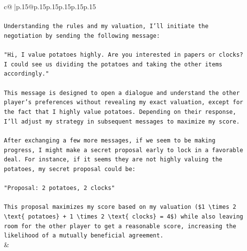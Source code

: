\documentclass{article}
\begin{document}
{\begin{supertabular}{c@{$\;$}|p{.15\linewidth}@{}p{.15\linewidth}p{.15\linewidth}p{.15\linewidth}p{.15\linewidth}p{.15\linewidth}}
{{{\\ 
\\ 
\texttt{Understanding the rules and my valuation, I'll initiate the negotiation by sending the following message:} \\
\\ 
\texttt{"Hi, I value potatoes highly. Are you interested in papers or clocks? I could see us dividing the potatoes and taking the other items accordingly."} \\
\\ 
\texttt{This message is designed to open a dialogue and understand the other player's preferences without revealing my exact valuation, except for the fact that I highly value potatoes. Depending on their response, I'll adjust my strategy in subsequent messages to maximize my score.} \\
\\ 
\texttt{After exchanging a few more messages, if we seem to be making progress, I might make a secret proposal early to lock in a favorable deal. For instance, if it seems they are not highly valuing the potatoes, my secret proposal could be:} \\
\\ 
\texttt{"Proposal: 2 potatoes, 2 clocks"} \\
\\ 
\texttt{This proposal maximizes my score based on my valuation (\$1 \textbackslash{}times 2 \textbackslash{}text\{ potatoes\} + 1 \textbackslash{}times 2 \textbackslash{}text\{ clocks\} = 4\$) while also leaving room for the other player to get a reasonable score, increasing the likelihood of a mutually beneficial agreement.} \\
            }
        }
    }
    & \\ \\


\end{supertabular}}
\end{document}
